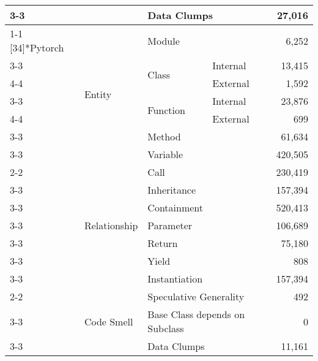 \begin{tabularx}{\linewidth}{p{1.8cm}p{1.8cm}Xp{0.8cm}r}
\cmidrule{3-3}\cmidrule{4-4}\cmidrule{5-5}
 &  & \multicolumn{2}{l}{Data Clumps} & 27,016 \\
\cmidrule{1-1}\cmidrule{2-2}\cmidrule{3-3}\cmidrule{4-4}\cmidrule{5-5}
\multirow{17}[34]{*}{Pytorch} & \multirow{7}[14]{*}{Entity} & \multicolumn{2}{l}{Module} & 6,252 \\
\cmidrule{3-3}\cmidrule{4-4}\cmidrule{5-5}
 &  & \multirow{2}[4]{*}{Class} & Internal & 13,415 \\
\cmidrule{4-4}\cmidrule{5-5}
 &  &  & External & 1,592 \\
\cmidrule{3-3}\cmidrule{4-4}\cmidrule{5-5}
 &  & \multirow{2}[4]{*}{Function} & Internal & 23,876 \\
\cmidrule{4-4}\cmidrule{5-5}
 &  &  & External & 699 \\
\cmidrule{3-3}\cmidrule{4-4}\cmidrule{5-5}
 &  & \multicolumn{2}{l}{Method} & 61,634 \\
\cmidrule{3-3}\cmidrule{4-4}\cmidrule{5-5}
 &  & \multicolumn{2}{l}{Variable} & 420,505 \\
\cmidrule{2-2}\cmidrule{3-3}\cmidrule{4-4}\cmidrule{5-5}
 & \multirow{7}[14]{*}{Relationship} & \multicolumn{2}{l}{Call} & 230,419 \\
\cmidrule{3-3}\cmidrule{4-4}\cmidrule{5-5}
 &  & \multicolumn{2}{l}{Inheritance} & 157,394 \\
\cmidrule{3-3}\cmidrule{4-4}\cmidrule{5-5}
 &  & \multicolumn{2}{l}{Containment} & 520,413 \\
\cmidrule{3-3}\cmidrule{4-4}\cmidrule{5-5}
 &  & \multicolumn{2}{l}{Parameter} & 106,689 \\
\cmidrule{3-3}\cmidrule{4-4}\cmidrule{5-5}
 &  & \multicolumn{2}{l}{Return} & 75,180 \\
\cmidrule{3-3}\cmidrule{4-4}\cmidrule{5-5}
 &  & \multicolumn{2}{l}{Yield} & 808 \\
\cmidrule{3-3}\cmidrule{4-4}\cmidrule{5-5}
 &  & \multicolumn{2}{l}{Instantiation} & 157,394 \\
\cmidrule{2-2}\cmidrule{3-3}\cmidrule{4-4}\cmidrule{5-5}
 & \multirow{3}[6]{*}{Code Smell} & \multicolumn{2}{l}{\begin{minipage}[t]{2.2cm}Speculative \newline Generality\end{minipage}} & 492 \\
\cmidrule{3-3}\cmidrule{4-4}\cmidrule{5-5}
 &  & \multicolumn{2}{l}{\begin{minipage}[t]{2.2cm}Base Class depends on Subclass\end{minipage}} & 0 \\
\cmidrule{3-3}\cmidrule{4-4}\cmidrule{5-5}
 &  & \multicolumn{2}{l}{Data Clumps} & 11,161 \\
\bottomrule
\end{tabularx}

